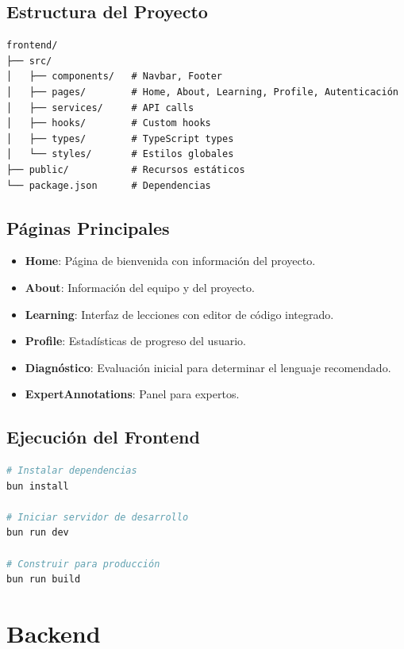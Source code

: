\documentclass[12pt,a4paper]{article}
\begin{document}
\subsection{Estructura del Proyecto}
\begin{verbatim}
frontend/
├── src/
│   ├── components/   # Navbar, Footer
│   ├── pages/        # Home, About, Learning, Profile, Autenticación
│   ├── services/     # API calls
│   ├── hooks/        # Custom hooks
│   ├── types/        # TypeScript types
│   └── styles/       # Estilos globales
├── public/           # Recursos estáticos
└── package.json      # Dependencias
\end{verbatim}

\subsection{Páginas Principales}
\begin{itemize}
    \item \textbf{Home}: Página de bienvenida con información del proyecto.
    \item \textbf{About}: Información del equipo y del proyecto.
    \item \textbf{Learning}: Interfaz de lecciones con editor de código integrado.
    \item \textbf{Profile}: Estadísticas de progreso del usuario.
    \item \textbf{Diagnóstico}: Evaluación inicial para determinar el lenguaje recomendado.
    \item \textbf{ExpertAnnotations}: Panel para expertos.
\end{itemize}

\subsection{Ejecución del Frontend}
\begin{lstlisting}[language=bash]
# Instalar dependencias
bun install

# Iniciar servidor de desarrollo
bun run dev

# Construir para producción
bun run build
\end{lstlisting}

\section{Backend}
\end{document}
